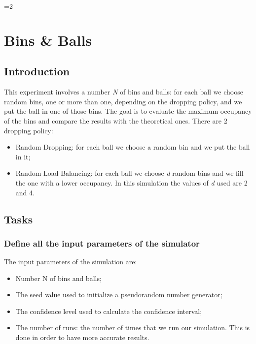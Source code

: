 \documentclass{report}
\newcounter{debug}
\begin{document}
\ifnum\value{debug}=2 {
    
\chapter{Bins \& Balls}
	 
	\section{Introduction}
	 
	This experiment involves a number \emph{N} of bins and balls: for each ball we choose random bins, one or more than one, depending on the dropping policy, and we put the ball in one of those bins. The goal is to evaluate the maximum occupancy of the bins and compare the results with the theoretical ones. There are 2 dropping policy:
	\begin{itemize}
		\item Random Dropping: for each ball we choose a random bin and we put the ball in it; 
		\item Random Load Balancing: for each ball we choose \emph{d} random bins and we fill the one with a lower occupancy. In this simulation the values of \emph{d} used are 2 and 4.
	\end{itemize}

	\section{Tasks}
	 
		\subsection{Define all the input parameters of the simulator}
			The input parameters of the simulation are:
			\begin{itemize}
				\item Number N of bins and balls;
				\item The seed value used to initialize a pseudorandom number generator;
				\item The confidence level used to calculate the confidence interval;
				\item The number of runs: the number of times that we run our simulation. This is done in order to have more accurate results.
			\end{itemize}
			 
}
\end{document}
